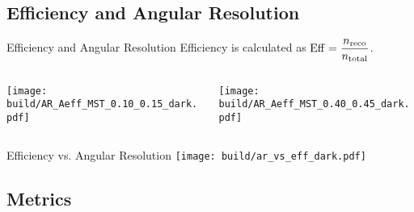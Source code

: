 \subsection{Efficiency and Angular Resolution}%
\label{sub:Efficiency_AR}

\begin{frame}{Efficiency and Angular Resolution}
    Efficiency is calculated as \(\displaystyle \operatorname{Eff} = \frac{n_\text{reco}}{n_\text{total}}\).
    \begin{columns}
        \begin{column}{0.48\textwidth}
            \centering
            \texttt{[image: build/AR\_Aeff\_MST\_0.10\_0.15\_dark.pdf]}
        \end{column}
        \hspace{-3cm}
        \begin{column}{0.48\textwidth}
            \centering
            \texttt{[image: build/AR\_Aeff\_MST\_0.40\_0.45\_dark.pdf]}
        \end{column}
    \end{columns}
\end{frame}

\begin{frame}{Efficiency vs. Angular Resolution}
    \centering
    \texttt{[image: build/ar\_vs\_eff\_dark.pdf]}
\end{frame}

\subsection{Metrics}%
\label{sub:Metrics}

